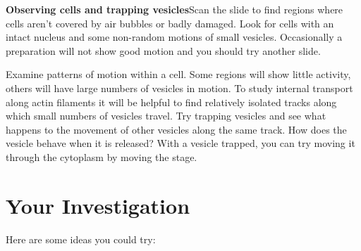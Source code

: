 \documentclass{../lab}
\begin{document}
\textbf{Observing cells and trapping vesicles}Scan the slide to find regions where cells aren't covered by air bubbles or badly damaged. Look for cells with an intact nucleus and some non-random motions of small vesicles. Occasionally a preparation will not show good motion and you should try another slide.

Examine patterns of motion within a cell. Some regions will show little activity, others will have large numbers of vesicles in motion. To study internal transport along actin filaments it will be helpful to find relatively isolated tracks along which small numbers of vesicles travel. Try trapping vesicles and see what happens to the movement of other vesicles along the same track. How does the vesicle behave when it is released? With a vesicle trapped, you can try moving it through the cytoplasm by moving the stage.

\section{Your Investigation}

Here are some ideas you could try:
\end{document}
